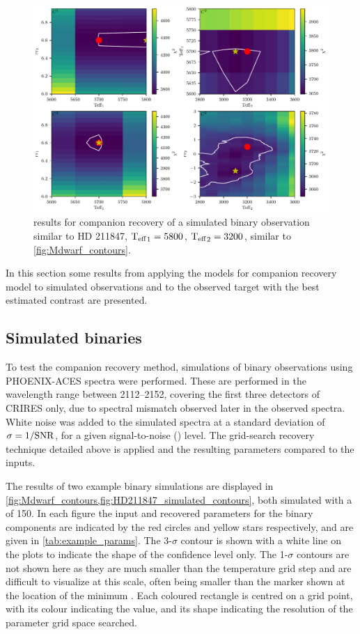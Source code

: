 \begin{figure}
    \centering
    \includegraphics[width=0.8\linewidth]{figures/companion_recovery/HD211847_example_pcolors}
    \caption[\textchisquared{} contour for companion recovery of a simulated observation of {HD 211847}.]{ \textchisquared{} results for companion recovery of a simulated binary observation similar to {HD 211847}, \({\textrm{T}_{\mathrm{eff}}}_{1} = 5800\)\K{}, \({\textrm{T}_{\mathrm{eff}}}_{2} = 3200\)\K{}, similar to \cref{fig:Mdwarf_contours}.}
    \label{fig:HD211847_simulated_contours}
\end{figure}

In this section some results from applying the models for companion recovery model to simulated observations and to the observed target with the best estimated contrast are presented.

\subsection{Simulated binaries}
\label{subsec:simulated_binaries}
To test the companion recovery method, simulations of binary observations using {PHOENIX-ACES} spectra were performed.
These are performed in the wavelength range between 2112--2152\nm{}, covering the first three detectors of CRIRES only, due to spectral mismatch observed later in the observed spectra.
White noise was added to the simulated spectra at a standard deviation of \(\sigma = 1/{\textrm{SNR}{}}\), for a given signal-to-noise (\snr{}) level.
The \textchisquared{} grid-search recovery technique detailed above is applied and the resulting parameters compared to the inputs.

The results of two example binary simulations are displayed in \cref{fig:Mdwarf_contours,fig:HD211847_simulated_contours}, both simulated with a \snr{} of 150.
In each figure the input and recovered parameters for the binary components are indicated by the red circles and yellow stars respectively, and are given in \cref{tab:example_params}.
The 3-\(\sigma\) contour is shown with a white line on the plots to indicate the shape of the confidence level only.
The 1-\(\sigma\) contours are not shown here as they are much smaller than the temperature grid step and are difficult to visualize at this scale, often being smaller than the marker shown at the location of the minimum \textchisquared{}.
Each coloured rectangle is centred on a grid point, with its colour indicating the \textchisquared{} value, and its shape indicating the resolution of the parameter grid space searched.

